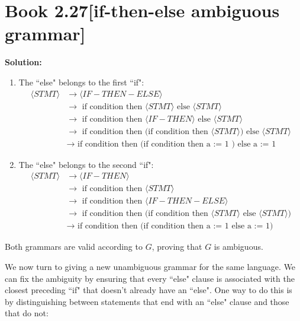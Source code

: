 \documentclass[11pt]{article}
\newenvironment{question}[2]
{\newpage\section{#1\texorpdfstring{\hfill}{horizontal spacing}{\rm\normalsize #2}}}{}
\newenvironment{solution}
{\textbf{Solution: }\color{blue}}
{\color{black}}
\begin{document}
\begin{question}{Book 2.27}{[if-then-else ambiguous grammar]}
\begin{solution}
\begin{enumerate}
    \item The ``else" belongs to the first ``if":
    \begin{equation*}
        \begin{split}
            \langle STMT \rangle &\rightarrow \langle IF-THEN-ELSE \rangle \\
                                 &\rightarrow \text{ if condition then } \langle STMT \rangle \text{ else } \langle STMT \rangle \\
                                 &\rightarrow \text{ if condition then } \langle IF-THEN \rangle \text{ else } \langle STMT \rangle \\
                                 &\rightarrow \text{ if condition then (if condition then } \langle STMT \rangle \text{) else } \langle STMT \rangle \\
                                 &\rightarrow \text{ if condition then (if condition then a := 1 ) else a := 1}
        \end{split}
    \end{equation*}
    \item The ``else" belongs to the second ``if":
    \begin{equation*}
        \begin{split}
            \langle STMT \rangle &\rightarrow \langle IF-THEN \rangle \\
                                 &\rightarrow \text{ if condition then } \langle STMT \rangle \\
                                 &\rightarrow \text{ if condition then } \langle IF-THEN-ELSE \rangle \\
                                 &\rightarrow \text{ if condition then (if condition then } \langle STMT \rangle \text{ else } \langle STMT \rangle \text{)} \\
                                 &\rightarrow \text{ if condition then (if condition then a := 1 else a := 1)}
        \end{split}
    \end{equation*}
\end{enumerate}

Both grammars are valid according to \(G\), proving that \(G\) is ambiguous.

We now turn to giving a new unambiguous grammar for the same language. We can fix the ambiguity by ensuring that every ``else" clause is associated with the closest preceding ``if" that doesn't already have an ``else". One way to do this is by distinguishing between statements that end with an ``else" clause and those that do not:


\end{solution}
\end{question}
\end{document}
